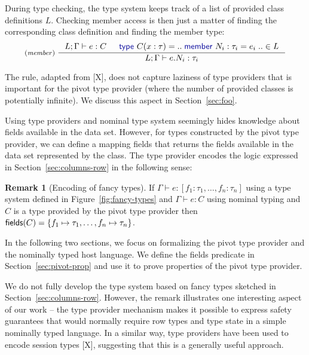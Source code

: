 \documentclass[a4paper,UKenglish]{lipics-v2016}
\theoremstyle{plain}
\theoremstyle{definition}
\newtheorem{rmrk}{Remark}
\newcommand{\kvd}[1]{\textnormal{\textcolor{kvdclr}{\sffamily #1}}}
\newcommand{\ident}[1]{\textnormal{\sffamily #1}}
\begin{document}
\noindent
During type checking, the type system keeps track of a list of provided class definitions $L$. 
Checking member access is then just a matter of finding the corresponding class definition and
finding the member type:
%
\begin{equation*}
\inference[(\emph{member})~]
  {L; \Gamma \vdash e : C & \kvd{type}~C(x:\tau) = ..\;\kvd{member}~N_i : \tau_i = e_i\;.. \in L}
  {L; \Gamma \vdash e.N_i:\tau_i}
\end{equation*}

\noindent
The rule, adapted from [X], does not capture laziness of type providers that is 
important for the pivot type provider (where the number of provided classes is potentially 
infinite). We discuss this aspect in Section~\ref{sec:foo}.

Using type providers and nominal type system seemingly hides knowledge about fields available
in the data set. However, for types constructed by the pivot type provider, we can define a 
mapping \ident{fields} that returns the fields available in the data set represented by the 
class. The type provider encodes the logic expressed in Section~\ref{sec:columns-row} in the
following sense:

\begin{rmrk}[Encoding of fancy types]
\label{thm:encoding-fancy}
If $\Gamma\vdash e:[f_1\!:\!\tau_1, \ldots, f_n\!:\!\tau_n]$ using a type system defined in 
Figure~\ref{fig:fancy-types} and $\Gamma\vdash e:C$ using nominal typing and $C$ is a type 
provided by the pivot type provider then $\ident{fields}(C) = \{ f_1\mapsto\tau_1, \ldots, f_n\mapsto\tau_n \}$.
\end{rmrk}

\noindent
In the following two sections, we focus on formalizing the pivot type provider and the nominally 
typed host language. We define the \ident{fields} predicate in Section~\ref{sec:pivot-prop} and use it 
to prove properties of the pivot type provider.

We do not fully develop the type system based on fancy types sketched in Section~\ref{sec:columns-row}.
However, the remark illustrates one interesting aspect of our work -- the type provider 
mechanism makes it possible to express safety guarantees that would normally require row types and 
type state in a simple nominally typed language. In a similar way, type providers have been used
to encode session types [X], suggesting that this is a generally useful approach.

\end{document}
